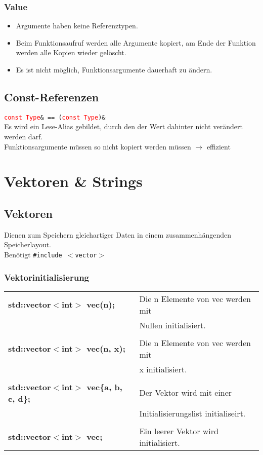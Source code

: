 \documentclass[a3paper, 10pt, landscape]{scrartcl}
\newcommand{\code}[1]{\texttt{#1}}
\begin{document}
\begin{multicols*}{3}
	\subsubsection{Value}
	\vspace{0.1cm}
	\begin{itemize}
		\item Argumente haben keine Referenztypen.
		\item Beim Funktionsaufruf werden alle Argumente kopiert, am Ende der Funktion werden alle Kopien wieder gelöscht.
		\item Es ist nicht möglich, Funktionsargumente dauerhaft zu ändern.
	\end{itemize}
	
	\subsection{Const-Referenzen}
	\vspace{0.1cm}
	\code{\textcolor{red}{const Type}\& == (\textcolor{red}{const Type})\& \\}
	Es wird ein Lese-Alias gebildet, durch den der Wert dahinter nicht verändert werden darf. \\
	Funktionsargumente müssen so nicht kopiert werden müssen $\rightarrow$ effizient
	\vspace{3cm}


\section{Vektoren \& Strings}

	\subsection{Vektoren}
	Dienen zum Speichern gleichartiger Daten in einem zusammenhängenden Speicherlayout. \\
	Benötigt \code{\#include $<$vector$>$}
	
	\subsubsection{Vektorinitialisierung}
	
	\begin{tabular}{l l}
	
	\textbf{std::vector$<$int$>$ vec(n);} & Die n Elemente von vec werden mit \\
	& Nullen initialisiert. \\
	\\
	\textbf{std::vector$<$int$>$ vec(n, x);} & Die n Elemente von vec werden mit \\
	&  x initialisiert. \\
	\\
	\textbf{std::vector$<$int$>$ vec\{a, b, c, d\};} &Der Vektor wird mit einer \\
	& Initialisierungslist initialiseirt. \\
	\\
	\textbf{std::vector$<$int$>$ vec;} & Ein leerer Vektor wird initialisiert.
	\end{tabular}
	

\end{multicols*}
\end{document}
